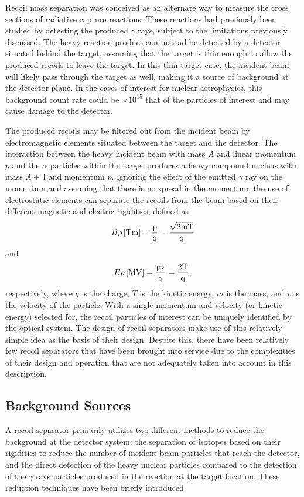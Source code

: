 Recoil mass separation was conceived as an alternate way to measure the cross
sections of radiative capture reactions. These reactions had previously been
studied by detecting the produced $\gamma$ rays, subject to the limitations
previously discussed. The heavy reaction product can instead be detected by a
detector situated behind the target, assuming that the target is thin enough to
allow the produced recoils to leave the target. In this thin target case, the
incident beam will likely pass through the target as well, making it a source
of background at the detector plane. In the cases of interest for nuclear
astrophysics, this background count rate could be $\times 10^{15}$ that of the
particles of interest and may cause damage to the detector.

The produced recoils may be filtered out from the incident beam by
electromagnetic elements situated between the target and the detector. The
interaction between the heavy incident beam with mass $A$ and linear momentum
$p$ and the $\alpha$ particles within
the target produces a heavy compound nucleus with mass $A + 4$ and momentum
$p$. Ignoring the effect of the emitted $\gamma$ ray on the momentum and
assuming that there is no spread in the momentum, the use of electrostatic
elements can separate the recoils from the beam based on their different
magnetic and electric rigidities, defined as
\[
    B\rho\,\rm{[Tm]} = \frac{p}{q} = \frac{\sqrt{2mT}}{q}
\]
and
\[
    E\rho\,\rm{[MV]} = \frac{pv}{q} = \frac{2T}{q},
\]
respectively, where $q$ is the charge, $T$ is the kinetic energy, $m$ is the
mass, and $v$ is the velocity of the particle. With a single momentum and
velocity (or kinetic energy) selected for, the recoil particles of interest can
be uniquely identified by the optical system. The design of recoil separators
make use of this relatively simple idea as the basis of their design. Despite
this, there have been relatively few recoil separators that have been brought
into service due to the complexities of their design and operation that are not
adequately taken into account in this description.


\subsection{Background Sources}

A recoil separator primarily utilizes two different methods to reduce the
background at the detector system: the separation of isotopes based on their
rigidities to reduce the number of incident beam particles that reach the
detector, and the direct detection of the heavy nuclear particles compared to
the detection of the $\gamma$ rays particles produced in the reaction at the
target location. These reduction techniques have been briefly introduced.

